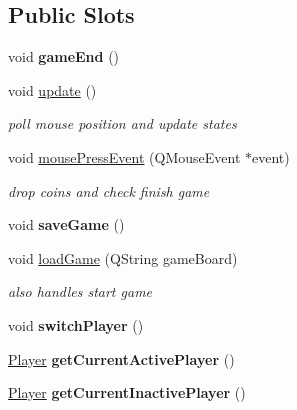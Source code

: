 \subsection*{\-Public \-Slots}
\begin{DoxyCompactItemize}
\item 
\hypertarget{classGameManager_a55876082b15630acf8109b5f0a33e6bd}{void {\bfseries game\-End} ()}\label{classGameManager_a55876082b15630acf8109b5f0a33e6bd}

\item 
\hypertarget{classGameManager_a7ecc3a14cd9e92f50729b37d1364953f}{void \hyperlink{classGameManager_a7ecc3a14cd9e92f50729b37d1364953f}{update} ()}\label{classGameManager_a7ecc3a14cd9e92f50729b37d1364953f}

\begin{DoxyCompactList}\small\item\em poll mouse position and update states \end{DoxyCompactList}\item 
\hypertarget{classGameManager_ac15bf5701604781f66047dc8c94f70a7}{void \hyperlink{classGameManager_ac15bf5701604781f66047dc8c94f70a7}{mouse\-Press\-Event} (\-Q\-Mouse\-Event $\ast$event)}\label{classGameManager_ac15bf5701604781f66047dc8c94f70a7}

\begin{DoxyCompactList}\small\item\em drop coins and check finish game \end{DoxyCompactList}\item 
\hypertarget{classGameManager_a452f27d846213676394663c8d223983d}{void {\bfseries save\-Game} ()}\label{classGameManager_a452f27d846213676394663c8d223983d}

\item 
\hypertarget{classGameManager_ad7e262dd756247130c085ead21b34d87}{void \hyperlink{classGameManager_ad7e262dd756247130c085ead21b34d87}{load\-Game} (\-Q\-String game\-Board)}\label{classGameManager_ad7e262dd756247130c085ead21b34d87}

\begin{DoxyCompactList}\small\item\em also handles start game \end{DoxyCompactList}\item 
\hypertarget{classGameManager_af49538ffbacf3ed465fe23191f0a7378}{void {\bfseries switch\-Player} ()}\label{classGameManager_af49538ffbacf3ed465fe23191f0a7378}

\item 
\hypertarget{classGameManager_aef672bf56ae84eb10a65bf227e487717}{\hyperlink{classPlayer}{\-Player} {\bfseries get\-Current\-Active\-Player} ()}\label{classGameManager_aef672bf56ae84eb10a65bf227e487717}

\item 
\hypertarget{classGameManager_a875582122292a52ffcae786a46490f89}{\hyperlink{classPlayer}{\-Player} {\bfseries get\-Current\-Inactive\-Player} ()}\label{classGameManager_a875582122292a52ffcae786a46490f89}

\end{DoxyCompactItemize}
